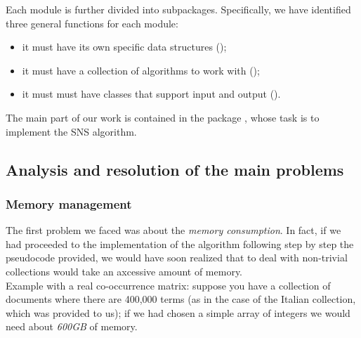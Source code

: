         Each module is further divided into subpackages. Specifically, we have identified three general functions for each module:
        \begin{itemize}
            \item it must have its own specific data structures ();
            \item it must have a collection of algorithms to work with ();
            \item it must must have classes that support input and output ().
        \end{itemize}

        The main part of our work is contained in the package , whose task is to implement the SNS algorithm.

    \subsection{Analysis and resolution of the main problems}
        \subsubsection{Memory management}\label{sec:memory-management}
            The first problem we faced was about the \emph{memory consumption}. In fact, if we had proceeded to the implementation of the algorithm following step by step the pseudocode provided, we would have soon realized that to deal with non-trivial collections would take an axcessive amount of memory.\\
            Example with a real co-occurrence matrix: suppose you have a collection of documents where there are 400,000 terms (as in the case of the Italian collection, which was provided to us); if we had chosen a simple array of integers we would need about \emph{600GB} of memory.\par

